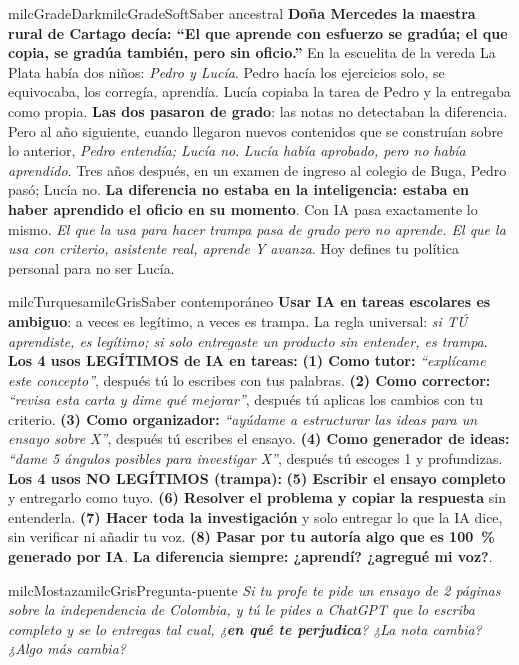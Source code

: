\documentclass[11pt,letterpaper]{article}
\begin{document}
\begin{softbox}{milcGradeDark}{milcGradeSoft}{Saber ancestral}
\textbf{Doña Mercedes la maestra rural de Cartago decía: ``El que aprende con esfuerzo se gradúa; el que copia, se gradúa también, pero sin oficio.''} En la escuelita de la vereda La Plata había dos niños: \emph{Pedro y Lucía}. Pedro hacía los ejercicios solo, se equivocaba, los corregía, aprendía. Lucía copiaba la tarea de Pedro y la entregaba como propia. \textbf{Las dos pasaron de grado}: las notas no detectaban la diferencia. Pero al año siguiente, cuando llegaron nuevos contenidos que se construían sobre lo anterior, \emph{Pedro entendía; Lucía no}. \emph{Lucía había aprobado, pero no había aprendido}. Tres años después, en un examen de ingreso al colegio de Buga, Pedro pasó; Lucía no. \textbf{La diferencia no estaba en la inteligencia: estaba en haber aprendido el oficio en su momento}. Con IA pasa exactamente lo mismo. \emph{El que la usa para hacer trampa pasa de grado pero no aprende. El que la usa con criterio, asistente real, aprende Y avanza}. Hoy defines tu política personal para no ser Lucía.
\end{softbox}

\begin{softbox}{milcTurquesa}{milcGris}{Saber contemporáneo}
\textbf{Usar IA en tareas escolares es ambiguo}: a veces es legítimo, a veces es trampa. La regla universal: \emph{si TÚ aprendiste, es legítimo; si solo entregaste un producto sin entender, es trampa}. \textbf{Los 4 usos LEGÍTIMOS de IA en tareas:} \textbf{(1) Como tutor:} \emph{``explícame este concepto''}, después tú lo escribes con tus palabras. \textbf{(2) Como corrector:} \emph{``revisa esta carta y dime qué mejorar''}, después tú aplicas los cambios con tu criterio. \textbf{(3) Como organizador:} \emph{``ayúdame a estructurar las ideas para un ensayo sobre X''}, después tú escribes el ensayo. \textbf{(4) Como generador de ideas:} \emph{``dame 5 ángulos posibles para investigar X''}, después tú escoges 1 y profundizas. \textbf{Los 4 usos NO LEGÍTIMOS (trampa):} \textbf{(5) Escribir el ensayo completo} y entregarlo como tuyo. \textbf{(6) Resolver el problema y copiar la respuesta} sin entenderla. \textbf{(7) Hacer toda la investigación} y solo entregar lo que la IA dice, sin verificar ni añadir tu voz. \textbf{(8) Pasar por tu autoría algo que es 100~\% generado por IA}. \textbf{La diferencia siempre: ¿aprendí? ¿agregué mi voz?}.
\end{softbox}

\begin{softbox}{milcMostaza}{milcGris}{Pregunta-puente}
\textit{Si tu profe te pide un ensayo de 2 páginas sobre la independencia de Colombia, y tú le pides a ChatGPT que lo escriba completo y se lo entregas tal cual, ¿\textbf{en qué te perjudica}? ¿La nota cambia? ¿Algo más cambia?}
\end{softbox}
\end{document}
